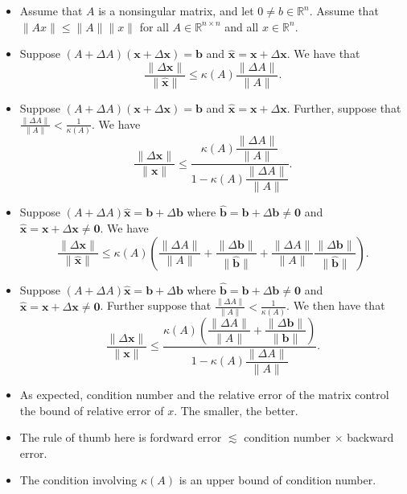 \documentclass[11pt,reqno]{amsart}
\theoremstyle{remark}
\begin{document}
\begin{itemize}
\item Assume that $A$ is a nonsingular matrix, and let $0\neq b\in \mathbb{R}^n$.
Assume that $\lVert Ax\rVert\leq\lVert A\rVert\lVert x\rVert$ for all $A\in \mathbb{R}^{n\times n}$ and all $x\in \mathbb{R}^n$.
\item Suppose $(A+\Delta A)(\mathbf{x}+\Delta\mathbf{x})=\mathbf{b}$ and
$\mathbf{\hat{x}}=\mathbf{x}+\Delta\mathbf{x}$. We have that
\begin{equation}
\frac{\lVert\Delta\mathbf{x}\rVert}{\lVert\mathbf{\hat{x}}\rVert}\le
\kappa(A)\dfrac{\lVert\Delta A\rVert}{\lVert A\rVert}. \label{eq:perturb2}
\end{equation}
\item Suppose $(A+\Delta A)(\mathbf{x}+\Delta\mathbf{x})=\mathbf{b}$ and
$\mathbf{\hat{x}}=\mathbf{x}+\Delta\mathbf{x}$. Further, suppose that $\frac{\lVert\Delta A\rVert}
{\rVert A\rVert}<\frac 1{\kappa(A)}$.
We have
\begin{equation}
\frac{\lVert\Delta\mathbf{x}\rVert}{\lVert\mathbf{x}\rVert}\le\frac
{\kappa(A)\dfrac{\lVert\Delta A\rVert}{\lVert A\rVert}}{1-\kappa
(A)\dfrac{\lVert\Delta A\rVert}{\lVert A\rVert}}.
\end{equation}
\item Suppose $(A+\Delta A)\mathbf{\hat{x}}=\mathbf{b}
+\Delta\mathbf{b}$ where $\mathbf{\hat{b}}=\mathbf{b}+\Delta\mathbf{b}
\neq\mathbf{0}$ and $\mathbf{\hat{x}}=\mathbf{x}+\Delta\mathbf{x}
\neq\mathbf{0}$. We have
\begin{equation}
\frac{\lVert\Delta\mathbf{x}\rVert}{\lVert\mathbf{\hat{x}}\rVert}\le
\kappa(A)\left(  \frac{\lVert\Delta A\rVert}{\lVert A\rVert}+\frac
{\lVert\Delta\mathbf{b}\rVert}{\lVert\mathbf{\hat{b}}\rVert}+\frac
{\lVert\Delta A\rVert}{\lVert A\rVert}\frac{\lVert\Delta\mathbf{b}\rVert
}{\lVert\mathbf{\hat{b}}\rVert}\right)  . \label{eq:perturb3}
\end{equation}
\item Suppose $(A+\Delta A)\mathbf{\hat{x}}=\mathbf{b}
+\Delta\mathbf{b}$ where $\mathbf{\hat{b}}=\mathbf{b}+\Delta\mathbf{b}
\neq\mathbf{0}$ and $\mathbf{\hat{x}}=\mathbf{x}+\Delta\mathbf{x}
\neq\mathbf{0}$. Further suppose that $\frac{\lVert\Delta A\rVert}{\rVert A\rVert}<\frac 1{\kappa(A)}$.
We then have that
\begin{equation}
\frac{\lVert\Delta\mathbf{x}\rVert}{\lVert\mathbf{x}\rVert}\le\frac
{\kappa(A)\left(  \dfrac{\lVert\Delta A\rVert}{\lVert A\rVert}+\dfrac
{\lVert\Delta\mathbf{b}\rVert}{\lVert\mathbf{b}\rVert}\right)  }
{1-\kappa(A)\dfrac{\lVert\Delta A\rVert}{\lVert A\rVert}}.
\end{equation}
\item As expected, condition number and the relative error of the matrix control the bound of relative error of $x$. The smaller, the better.
\item The rule of thumb here is fordward error $\lesssim$ condition number $\times$ backward error. 
\item The condition involving $\kappa(A)$ is an upper bound of condition number. 
\end{itemize}
\end{document}
